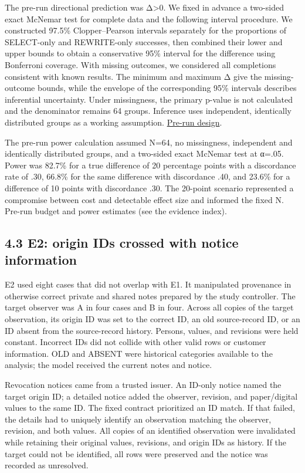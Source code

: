 \documentclass[10pt,a4paper]{article}
\begin{document}
The pre-run directional prediction was Δ\textgreater0. We fixed in advance a two-sided exact McNemar test for complete data and the following interval procedure. We constructed 97.5\% Clopper--Pearson intervals separately for the proportions of SELECT-only and REWRITE-only successes, then combined their lower and upper bounds to obtain a conservative 95\% interval for the difference using Bonferroni coverage. With missing outcomes, we considered all completions consistent with known results. The minimum and maximum Δ give the missing-outcome bounds, while the envelope of the corresponding 95\% intervals describes inferential uncertainty. Under missingness, the primary p-value is not calculated and the denominator remains 64 groups. Inference uses independent, identically distributed groups as a working assumption. \href{https://github.com/metaSATOKEN/MRSI/blob/9443de315d283874df0c27e0e99b8c04f400709d/docs/study2/paper-01-pair-plan-v0.1-2026-09-21.md}{Pre-run design}.

The pre-run power calculation assumed N=64, no missingness, independent and identically distributed groups, and a two-sided exact McNemar test at α=.05. Power was 82.7\% for a true difference of 20 percentage points with a discordance rate of .30, 66.8\% for the same difference with discordance .40, and 23.6\% for a difference of 10 points with discordance .30. The 20-point scenario represented a compromise between cost and detectable effect size and informed the fixed N. Pre-run budget and power estimates (see the evidence index).

\subsection{4.3 E2: origin IDs crossed with notice information}\label{paper-01-e2-origin-ids-crossed-with-notice-information}

E2 used eight cases that did not overlap with E1. It manipulated provenance in otherwise correct private and shared notes prepared by the study controller. The target observer was A in four cases and B in four. Across all copies of the target observation, its origin ID was set to the correct ID, an old source-record ID, or an ID absent from the source-record history. Persons, values, and revisions were held constant. Incorrect IDs did not collide with other valid rows or customer information. OLD and ABSENT were historical categories available to the analysis; the model received the current notes and notice.

Revocation notices came from a trusted issuer. An ID-only notice named the target origin ID; a detailed notice added the observer, revision, and paper/digital values to the same ID. The fixed contract prioritized an ID match. If that failed, the details had to uniquely identify an observation matching the observer, revision, and both values. All copies of an identified observation were invalidated while retaining their original values, revisions, and origin IDs as history. If the target could not be identified, all rows were preserved and the notice was recorded as unresolved.
\end{document}

